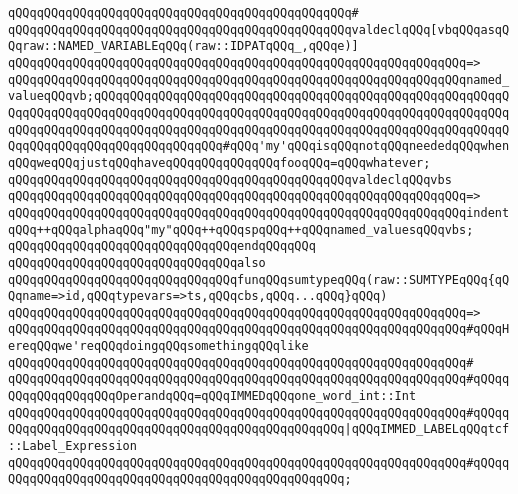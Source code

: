 \verb|qQQqqQQqqQQqqQQqqQQqqQQqqQQqqQQqqQQqqQQqqQQqqQQq#|\newline
\verb|qQQqqQQqqQQqqQQqqQQqqQQqqQQqqQQqqQQqqQQqqQQqqQQqvaldeclqQQq[vbqQQqasqQQqraw::NAMED_VARIABLEqQQq(raw::IDPATqQQq_,qQQqe)]|\newline
\verb|qQQqqQQqqQQqqQQqqQQqqQQqqQQqqQQqqQQqqQQqqQQqqQQqqQQqqQQqqQQqqQQq=>|\newline
\verb|qQQqqQQqqQQqqQQqqQQqqQQqqQQqqQQqqQQqqQQqqQQqqQQqqQQqqQQqqQQqqQQqnamed_valueqQQqvb;qQQqqQQqqQQqqQQqqQQqqQQqqQQqqQQqqQQqqQQqqQQqqQQqqQQqqQQqqQQqqQQqqQQqqQQqqQQqqQQqqQQqqQQqqQQqqQQqqQQqqQQqqQQqqQQqqQQqqQQqqQQqqQQqqQQqqQQqqQQqqQQqqQQqqQQqqQQqqQQqqQQqqQQqqQQqqQQqqQQqqQQqqQQqqQQqqQQqqQQqqQQqqQQqqQQqqQQqqQQqqQQqqQQq#qQQq'my'qQQqisqQQqnotqQQqneededqQQqwhenqQQqweqQQqjustqQQqhaveqQQqqQQqqQQqqQQqfooqQQq=qQQqwhatever;|\newline
\newline
\verb|qQQqqQQqqQQqqQQqqQQqqQQqqQQqqQQqqQQqqQQqqQQqqQQqvaldeclqQQqvbs|\newline
\verb|qQQqqQQqqQQqqQQqqQQqqQQqqQQqqQQqqQQqqQQqqQQqqQQqqQQqqQQqqQQqqQQq=>|\newline
\verb|qQQqqQQqqQQqqQQqqQQqqQQqqQQqqQQqqQQqqQQqqQQqqQQqqQQqqQQqqQQqqQQqindentqQQq++qQQqalphaqQQq"my"qQQq++qQQqspqQQq++qQQqnamed_valuesqQQqvbs;|\newline
\verb|qQQqqQQqqQQqqQQqqQQqqQQqqQQqqQQqendqQQqqQQq|\newline
\newline
\verb|qQQqqQQqqQQqqQQqqQQqqQQqqQQqqQQqalso|\newline
\verb|qQQqqQQqqQQqqQQqqQQqqQQqqQQqqQQqfunqQQqsumtypeqQQq(raw::SUMTYPEqQQq{qQQqname=>id,qQQqtypevars=>ts,qQQqcbs,qQQq...qQQq}qQQq)|\newline
\verb|qQQqqQQqqQQqqQQqqQQqqQQqqQQqqQQqqQQqqQQqqQQqqQQqqQQqqQQqqQQqqQQq=>|\newline
\verb|qQQqqQQqqQQqqQQqqQQqqQQqqQQqqQQqqQQqqQQqqQQqqQQqqQQqqQQqqQQqqQQq#qQQqHereqQQqwe'reqQQqdoingqQQqsomethingqQQqlike|\newline
\verb|qQQqqQQqqQQqqQQqqQQqqQQqqQQqqQQqqQQqqQQqqQQqqQQqqQQqqQQqqQQqqQQq#|\newline
\verb|qQQqqQQqqQQqqQQqqQQqqQQqqQQqqQQqqQQqqQQqqQQqqQQqqQQqqQQqqQQqqQQq#qQQqqQQqqQQqqQQqqQQqOperandqQQq=qQQqIMMEDqQQqone_word_int::Int|\newline
\verb|qQQqqQQqqQQqqQQqqQQqqQQqqQQqqQQqqQQqqQQqqQQqqQQqqQQqqQQqqQQqqQQq#qQQqqQQqqQQqqQQqqQQqqQQqqQQqqQQqqQQqqQQqqQQqqQQqqQQq|\verb#|qQQqIMMED_LABELqQQqtcf::Label_Expression#\newline
\verb|qQQqqQQqqQQqqQQqqQQqqQQqqQQqqQQqqQQqqQQqqQQqqQQqqQQqqQQqqQQqqQQq#qQQqqQQqqQQqqQQqqQQqqQQqqQQqqQQqqQQqqQQqqQQqqQQqqQQq;|\newline
